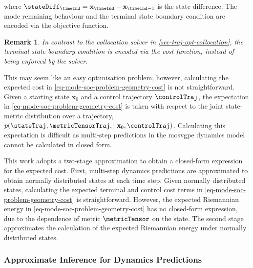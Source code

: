 \documentclass{mimosis-class/mimosis}
\newtheorem*{remark}{Remark}
\numberwithin{equation}{chapter}
\newcommand{\numData}{\ensuremath{t}}
\newcommand{\singleData}[1]{\ensuremath{#1_{\numData}}}
\newcommand{\state}{\ensuremath{\mathbf{x}}}
\newcommand{\control}{\ensuremath{\mathbf{u}}}
\newcommand{\x}{\ensuremath{\mathbf{x}}}
\newcommand{\y}{\ensuremath{y}}
\newcommand{\singleInput}{\ensuremath{\x_{\numData-1}}}
\newcommand{\singleOutput}{\ensuremath{\singleData{\y}}}
\begin{document}
{where \(\stateDiff_{\timeInd} = \state_{\timeInd} - \state_{\timeInd-1}\) is the state difference.
The mode remaining behaviour and the terminal state boundary condition are encoded via the objective function.
\begin{remark} \label{}
In contrast to the collocation solver in \cref{sec-traj-opt-collocation},
the terminal state boundary condition is encoded via the cost function, instead of being enforced by the solver.
\end{remark}
This may seem like an easy optimisation problem,
however, calculating the expected cost in \cref{eq-mode-soc-problem-geometry-cost} is not straightforward.
Given a starting state \(\state_0\) and a control trajectory \(\controlTraj\),
the expectation in \cref{eq-mode-soc-problem-geometry-cost} is taken with respect to the joint
state-metric distribution over a trajectory, \(p(\stateTraj, \metricTensorTraj, \mid \state_0, \controlTraj)\).
Calculating this expectation is difficult as multi-step predictions in the \acrshort{mosvgpe} dynamics model
cannot be calculated in closed form.

This work adopts a two-stage approximation to obtain a closed-form expression for the expected cost.
First, multi-step dynamics predictions are approximated to obtain normally distributed states at
each time step.
Given normally distributed states, calculating the expected terminal and control cost terms in
\cref{eq-mode-soc-problem-geometry-cost} is straightforward.
However, the expected Riemannian energy in \cref{eq-mode-soc-problem-geometry-cost} has no closed-form expression,
due to the dependence of metric \(\metricTensor\) on the state.
The second stage approximates the calculation of the expected Riemannian energy under normally distributed states.
\subsubsection{Approximate Inference for Dynamics Predictions \label{sec-dynamics-predictions}}
\label{sec:org0d41cdc}
\renewcommand{\singleInput}{\ensuremath{\state_\timeInd, \control_\timeInd}}
\renewcommand{\singleInput}{\ensuremath{\hat{\state}_\timeInd}}
\renewcommand{\singleOutput}{\ensuremath{\Delta\state_{\timeInd+1}}}

\newcommand{\desiredExpertKernel}{\ensuremath{k_{\desiredMode}}}
\newcommand{\desiredExpertInducingInput}{\ensuremath{\bm\zeta_{\desiredMode}}}

}
\end{document}
